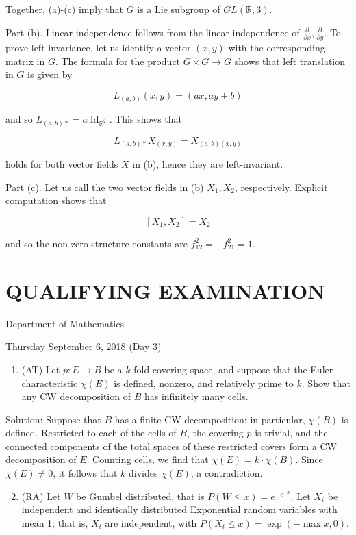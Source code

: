 \documentclass[10pt]{article}
\begin{document}
Together, (a)-(c) imply that $G$ is a Lie subgroup of $G L(\mathbb{R}, 3)$.

Part (b). Linear independence follows from the linear independence of $\frac{\partial}{\partial x}, \frac{\partial}{\partial y}$. To prove left-invariance, let us identify a vector $(x, y)$ with the corresponding matrix in $G$. The formula for the product $G \times G \rightarrow G$ shows that left translation in $G$ is given by

$$
L_{(a, b)}(x, y)=(a x, a y+b)
$$

and so $L_{(a, b) *}=a \operatorname{Id}_{\mathbb{R}^{2}}$. This shows that

$$
L_{(a, b) *} X_{(x, y)}=X_{(a, b)(x, y)}
$$

holds for both vector fields $X$ in (b), hence they are left-invariant.

Part (c). Let us call the two vector fields in (b) $X_{1}, X_{2}$, respectively. Explicit computation shows that

$$
\left[X_{1}, X_{2}\right]=X_{2}
$$

and so the non-zero structure constants are $f_{12}^{2}=-f_{21}^{2}=1$.

\section*{QUALIFYING EXAMINATION }
Department of Mathematics

Thursday September 6, 2018 (Day 3)

\begin{enumerate}
  \item (AT) Let $p: E \rightarrow B$ be a $k$-fold covering space, and suppose that the Euler characteristic $\chi(E)$ is defined, nonzero, and relatively prime to $k$. Show that any $\mathrm{CW}$ decomposition of $B$ has infinitely many cells.
\end{enumerate}

Solution: Suppose that $B$ has a finite CW decomposition; in particular, $\chi(B)$ is defined. Restricted to each of the cells of $B$, the covering $p$ is trivial, and the connected components of the total spaces of these restricted covers form a CW decomposition of $E$. Counting cells, we find that $\chi(E)=k \cdot \chi(B)$. Since $\chi(E) \neq 0$, it follows that $k$ divides $\chi(E)$, a contradiction.

\begin{enumerate}
  \setcounter{enumi}{1}
  \item (RA) Let $W$ be Gumbel distributed, that is $P(W \leq x)=e^{-e^{-x}}$. Let $X_{i}$ be independent and identically distributed Exponential random variables with mean 1; that is, $X_{i}$ are independent, with $P\left(X_{i} \leq x\right)=\exp (-\max x, 0)$.
\end{enumerate}
\end{document}

